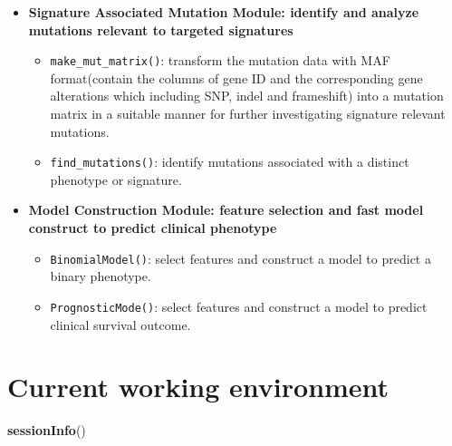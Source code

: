 \documentclass[
  12pt,
]{book}
\newenvironment{Shaded}{\begin{snugshade}}{\end{snugshade}}
\newcommand{\FunctionTok}[1]{\textcolor[rgb]{0.13,0.29,0.53}{\textbf{#1}}}
\newcommand{\NormalTok}[1]{#1}
\providecommand{\tightlist}{%
  \setlength{\itemsep}{0pt}\setlength{\parskip}{0pt}}
\begin{document}
\begin{itemize}
\item
  \textbf{Signature Associated Mutation Module: identify and analyze mutations relevant to targeted signatures}

  \begin{itemize}
  \tightlist
  \item
    \texttt{make\_mut\_matrix()}: transform the mutation data with MAF format(contain the columns of gene ID and the corresponding gene alterations which including SNP, indel and frameshift) into a mutation matrix in a suitable manner for further investigating signature relevant mutations.
  \item
    \texttt{find\_mutations()}: identify mutations associated with a distinct phenotype or signature.
  \end{itemize}
\item
  \textbf{Model Construction Module: feature selection and fast model construct to predict clinical phenotype}

  \begin{itemize}
  \tightlist
  \item
    \texttt{BinomialModel()}: select features and construct a model to predict a binary phenotype.
  \item
    \texttt{PrognosticMode()}: select features and construct a model to predict clinical survival outcome.
  \end{itemize}
\end{itemize}

\hypertarget{current-working-environment}{%
\section{Current working environment}\label{current-working-environment}}

\begin{Shaded}
\begin{Highlighting}[]
\FunctionTok{sessionInfo}\NormalTok{()}
\end{Highlighting}
\end{Shaded}
\end{document}
